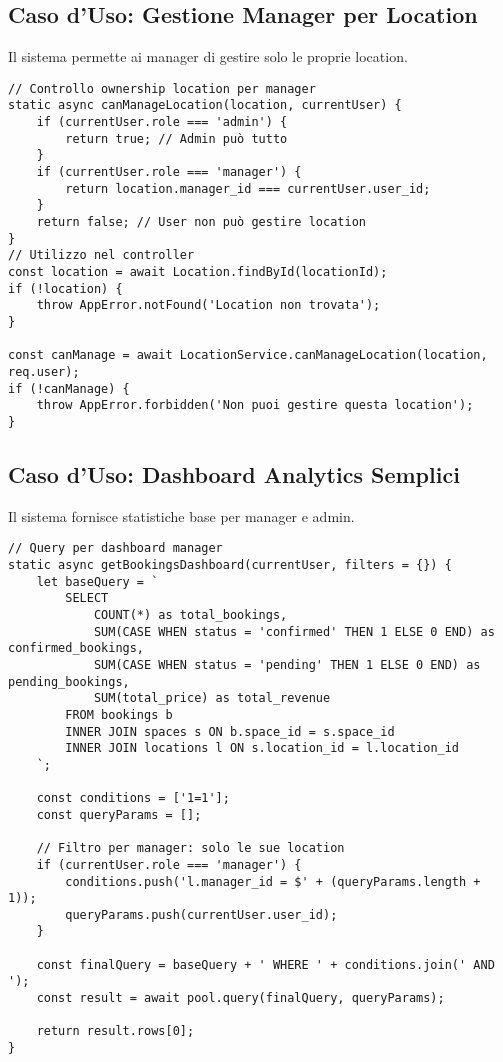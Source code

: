\subsection{Caso d'Uso: Gestione Manager per Location}

Il sistema permette ai manager di gestire solo le proprie location.

\begin{lstlisting}[caption=Validazione Ownership Manager (LocationService.js)]
// Controllo ownership location per manager
static async canManageLocation(location, currentUser) {
    if (currentUser.role === 'admin') {
        return true; // Admin può tutto
    }
    if (currentUser.role === 'manager') {
        return location.manager_id === currentUser.user_id;
    }
    return false; // User non può gestire location
}
// Utilizzo nel controller
const location = await Location.findById(locationId);
if (!location) {
    throw AppError.notFound('Location non trovata');
}

const canManage = await LocationService.canManageLocation(location, req.user);
if (!canManage) {
    throw AppError.forbidden('Non puoi gestire questa location');
}
\end{lstlisting}

\subsection{Caso d'Uso: Dashboard Analytics Semplici}

Il sistema fornisce statistiche base per manager e admin.

\begin{lstlisting}[caption=Statistiche Dashboard Manager (BookingService.js)]
// Query per dashboard manager
static async getBookingsDashboard(currentUser, filters = {}) {
    let baseQuery = `
        SELECT 
            COUNT(*) as total_bookings,
            SUM(CASE WHEN status = 'confirmed' THEN 1 ELSE 0 END) as confirmed_bookings,
            SUM(CASE WHEN status = 'pending' THEN 1 ELSE 0 END) as pending_bookings,
            SUM(total_price) as total_revenue
        FROM bookings b
        INNER JOIN spaces s ON b.space_id = s.space_id
        INNER JOIN locations l ON s.location_id = l.location_id
    `;

    const conditions = ['1=1'];
    const queryParams = [];

    // Filtro per manager: solo le sue location
    if (currentUser.role === 'manager') {
        conditions.push('l.manager_id = $' + (queryParams.length + 1));
        queryParams.push(currentUser.user_id);
    }

    const finalQuery = baseQuery + ' WHERE ' + conditions.join(' AND ');
    const result = await pool.query(finalQuery, queryParams);
    
    return result.rows[0];
}
\end{lstlisting}

